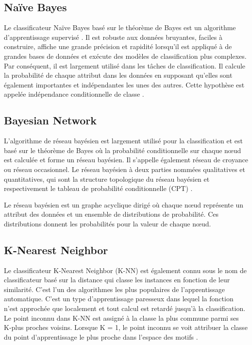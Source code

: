 \subsection{Naïve Bayes}
Le classificateur Naïve Bayes \cite{Bayesian} basé sur le théorème de Bayes est un algorithme d'apprentissage supervisé \cite{DefectPred}. Il est robuste aux données bruyantes, faciles à construire, affiche une grande précision et rapidité lorsqu'il est appliqué à de grandes bases de données et exécute des modèles de classification plus complexes. Par conséquent, il est largement utilisé dans les tâches de classification. Il calcule la probabilité de chaque attribut dans les données en supposant qu'elles sont également importantes et indépendantes les unes des autres. Cette hypothèse est appelée indépendance conditionnelle de classe \cite{KMean_DT} \cite{QUAIL}.

\subsection{Bayesian Network}
L'algorithme de réseau bayésien est largement utilisé pour la classification et est basé sur le théorème de Bayes où la probabilité conditionnelle sur chaque nœud est calculée et forme un réseau bayésien. Il s'appelle également réseau de croyance ou réseau occasionnel. Le réseau bayésien à deux parties nommées qualitatives et quantitatives, qui sont la structure topologique du réseau bayésien et respectivement le tableau de probabilité conditionnelle (CPT) \cite{Bayesian01}.

Le réseau bayésien est un graphe acyclique dirigé où chaque nœud représente un attribut des données et un ensemble de distributions de probabilité. Ces distributions donnent les probabilités pour la valeur de chaque nœud.

\subsection{K-Nearest Neighbor}
Le classificateur K-Nearest Neighbor (K-NN) \cite{ML00} est également connu sous le nom de classificateur basé sur la distance qui classe les instances en fonction de leur similarité. C'est l'un des algorithmes les plus populaires de l'apprentissage automatique. C'est un type d'apprentissage paresseux dans lequel la fonction n'est approchée que localement et tout calcul est retardé jusqu'à la classification. Le point inconnu dans K-NN est assigné à la classe la plus commune parmi ses K-plus proches voisins. Lorsque K = 1, le point inconnu se voit attribuer la classe du point d'apprentissage le plus proche dans l'espace des motifs \cite{ML01}.


